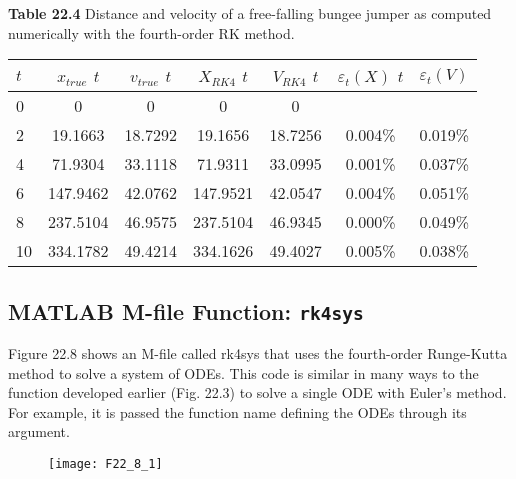 \documentclass[../main.tex]{subfiles}
\begin{document}
\vspace{0,3in}
\textbf{Table 22.4} Distance and velocity of a free-falling bungee jumper as computed
numerically with the fourth-order RK method.
\\
\begin{tabular}{lcccccc}
\hline

	\textbf{$t$} \; \; \; \; \; & \textbf{$x_{true}$} 
	\textbf{$t$} \; \; \; \; \; & \textbf{$v_{true}$} 
	\textbf{$t$} \; \; \; \; \; & \textbf{$X_{RK4}$} 
	\textbf{$t$} \; \; \; \; \; & \textbf{$V_{RK4}$} 
	\textbf{$t$} \; \; \; \; \; & \textbf{$\varepsilon_{t}(X)$} 
	\textbf{$t$} \; \; \; \; \; & \textbf{$\varepsilon_{t}(V)$}\\
	
\hline

	0 & 0 & 0 & 0 & 0 & \vspace{0in} & \vspace{0in}\\

	2 & 19.1663 & 18.7292 & 19.1656 & 18.7256 & 0.004\% & 0.019\%\\

	4 & 71.9304 & 33.1118 & 71.9311 & 33.0995 & 0.001\% & 0.037\%\\

	6 & 147.9462 & 42.0762 & 147.9521 & 42.0547 & 0.004\% & 0.051\%\\

	8 & 237.5104 & 46.9575 & 237.5104 & 46.9345 & 0.000\% & 0.049\%\\

	10 & 334.1782 & 49.4214 & 334.1626 & 49.4027 & 0.005\% & 0.038\%\\


\hline
\end{tabular}

\subsection{MATLAB M-file Function: \texttt{rk4sys}}

Figure 22.8 shows an M-file called rk4sys that uses the fourth-order Runge-Kutta method
to solve a system of ODEs. This code is similar in many ways to the function developed
earlier (Fig. 22.3) to solve a single ODE with Euler's method. For example, it is passed the
function name defining the ODEs through its argument.
\pagebreak
\begin{figure}[hbt!]
	\texttt{[image: F22\_8\_1]}
	\label{F22.8.1}
\end{figure}\\
\end{document}
